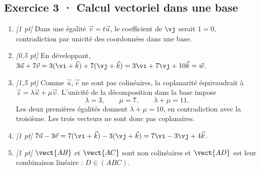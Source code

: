 \subsection*{Exercice 3 · Calcul vectoriel dans une base}\begin{enumerate}

\item \textit{[1 pt]} Dans une égalité $\vec v=t\vec u$, le coefficient de $\vj $ serait $1=0$, contradiction par unicité des coordonnées dans une base.

\item \textit{[0,5 pt]} En développant, $3\vec u+7\vec v=3(\vi +\vec k)+7(\vj +\vec k)=3\vi +7\vj +10\vec k=\vec w$.

\item \textit{[1,5 pt]} Comme $\vec u,\vec v$ ne sont pas colinéaires, la coplanarité équivaudrait à $\vec z=\lambda\vec u+\mu\vec v$. L'unicité de la décomposition dans la base impose
\[\lambda=3,\qquad\mu=7,\qquad\lambda+\mu=11.\]
Les deux premières égalités donnent $\lambda+\mu=10$, en contradiction avec la troisième. Les trois vecteurs ne sont donc pas coplanaires.

\item \textit{[1 pt]} $7\vec u-3\vec v=7(\vi +\vec k)-3(\vj +\vec k)=7\vi -3\vj +4\vec k$.

\item \textit{[1 pt]} $\vect{AB}$ et $\vect{AC}$ sont non colinéaires et $\vect{AD}$ est leur combinaison linéaire : $D\in(ABC)$.

\end{enumerate}


